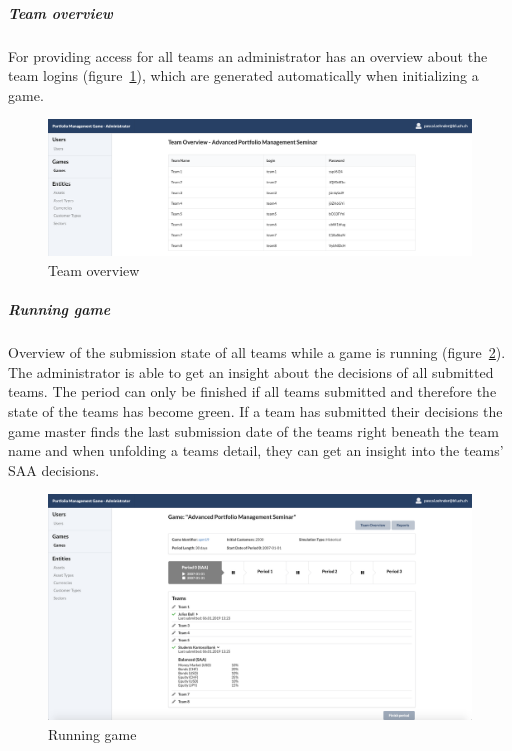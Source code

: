 \subparagraph{Team overview}
\label{subparagraph:team_overview}
For providing access for all teams an administrator has an overview about the team logins (figure~\ref{fig:team_overview}), which are generated automatically when initializing a game.
\begin{figure}[h!]
  \centering
  \includegraphics[scale=0.2]{img/application-overview/administrator/06_team_login_overview.png}
  \caption{Team overview}
  \label{fig:team_overview}
\end{figure}

\subparagraph{Running game}
Overview of the submission state of all teams while a game is running (figure~\ref{fig:running_game}). The administrator is able to get an insight about the decisions of all submitted teams. The period can only be finished if all teams submitted and therefore the state of the teams has become green. If a team has submitted their decisions the game master finds the last submission date of the teams right beneath the team name and when unfolding a teams detail, they can get an insight into the teams' SAA decisions.
\begin{figure}[h!]
  \centering
  \includegraphics[scale=0.2]{img/application-overview/administrator/07_running_game.png}
  \caption{Running game}
  \label{fig:running_game}
\end{figure}

